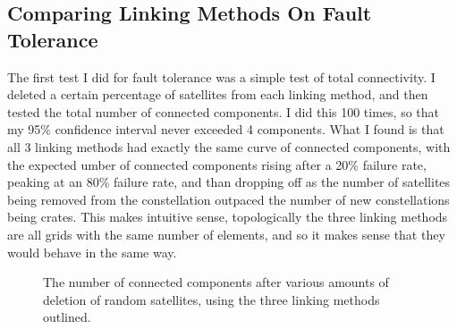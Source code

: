 \documentclass[12pt,a4paper,twoside,openright]{report}
\begin{document}
\subsection{Comparing Linking Methods On Fault Tolerance}

The first test I did for fault tolerance was a simple test of total connectivity. I deleted a certain percentage of satellites from each linking method, and then tested the total number of connected components. I did this 100 times, so that my 95\% confidence interval never exceeded 4 components. What I found is that all 3 linking methods had exactly the same curve of connected components, with the expected umber of connected components rising after a 20\% failure rate, peaking at an 80\% failure rate, and than dropping off as the number of satellites being removed from the constellation outpaced the number of new constellations being crates. This makes intuitive sense, topologically the three linking methods are all grids with the same number of elements, and so it makes sense that they would behave in the same way.

\begin{figure}
	\caption{The number of connected components after various amounts of deletion of random satellites, using the three linking methods outlined.}
	\label{fig:Connected Components After Deletions}
\end{figure}
\end{document}
